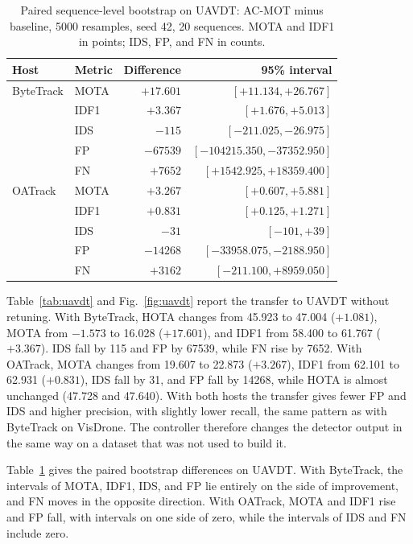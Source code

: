 \documentclass[journal]{new-aiaa}
\begin{document}
\begin{table}[htbp]
\caption{Paired sequence-level bootstrap on UAVDT: AC-MOT minus baseline,
5000 resamples, seed 42, 20 sequences. MOTA and IDF1 in points; IDS, FP, and
FN in counts.}
\label{tab:uavdt-boot}
\centering\footnotesize
\setlength{\tabcolsep}{4pt}
\begin{tabular}{@{}llrr@{}}
\toprule
Host & Metric & Difference & 95\% interval\\
\midrule
ByteTrack & MOTA & $+17.601$ & $[+11.134, +26.767]$\\
 & IDF1 & $+3.367$ & $[+1.676, +5.013]$\\
 & IDS & $-115$ & $[-211.025, -26.975]$\\
 & FP & $-67539$ & $[-104215.350, -37352.950]$\\
 & FN & $+7652$ & $[+1542.925, +18359.400]$\\
\midrule
OATrack & MOTA & $+3.267$ & $[+0.607, +5.881]$\\
 & IDF1 & $+0.831$ & $[+0.125, +1.271]$\\
 & IDS & $-31$ & $[-101, +39]$\\
 & FP & $-14268$ & $[-33958.075, -2188.950]$\\
 & FN & $+3162$ & $[-211.100, +8959.050]$\\
\bottomrule
\end{tabular}
\end{table}

Table~\ref{tab:uavdt} and Fig.~\ref{fig:uavdt} report the transfer to UAVDT
without retuning. With ByteTrack, HOTA changes from 45.923 to 47.004 ($+1.081$),
MOTA from $-1.573$ to 16.028 ($+17.601$), and IDF1 from 58.400 to 61.767
($+3.367$). IDS fall by 115 and FP by 67539, while FN rise by 7652. With
OATrack, MOTA changes from 19.607 to 22.873 ($+3.267$), IDF1 from 62.101 to
62.931 ($+0.831$), IDS fall by 31, and FP fall by 14268, while HOTA is almost
unchanged (47.728 and 47.640). With both hosts the transfer gives fewer FP and
IDS and higher precision, with slightly lower recall, the same pattern as with
ByteTrack on VisDrone. The controller therefore changes the detector output in
the same way on a dataset that was not used to build it.

Table~\ref{tab:uavdt-boot} gives the paired bootstrap differences on UAVDT.
With ByteTrack, the intervals of MOTA, IDF1, IDS, and FP lie entirely on the
side of improvement, and FN moves in the opposite direction. With OATrack,
MOTA and IDF1 rise and FP fall, with intervals on one side of zero, while the
intervals of IDS and FN include zero.
\end{document}
